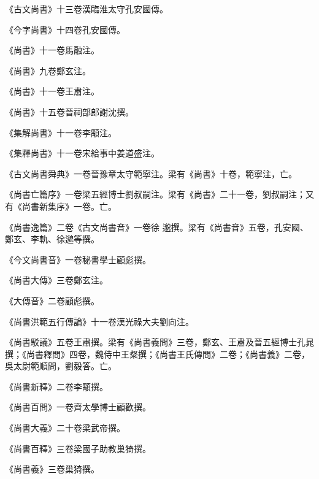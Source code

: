 \begin{pinyinscope}
 《古文尚書》十三卷漢臨淮太守孔安國傳。



 《今字尚書》十四卷孔安國傳。



 《尚書》十一卷馬融注。



 《尚書》九卷鄭玄注。



 《尚書》十一卷王肅注。



 《尚書》十五卷晉祠部郎謝沈撰。



 《集解尚書》十一卷李顒注。



 《集釋尚書》十一卷宋給事中姜道盛注。



 《古文尚書舜典》一卷晉豫章太守範寧注。梁有《尚書》十卷，範寧注，亡。



 《尚書亡篇序》一卷梁五經博士劉叔嗣注。梁有《尚書》二十一卷，劉叔嗣注；又有《尚書新集序》一卷。亡。



 《尚書逸篇》二卷《古文尚書音》一卷徐
 邈撰。梁有《尚書音》五卷，孔安國、鄭玄、李軌、徐邈等撰。



 《今文尚書音》一卷秘書學士顧彪撰。



 《尚書大傳》三卷鄭玄注。



 《大傳音》二卷顧彪撰。



 《尚書洪範五行傳論》十一卷漢光祿大夫劉向注。



 《尚書駁議》五卷王肅撰。梁有《尚書義問》三卷，鄭玄、王肅及晉五經博士孔晁撰；《尚書釋問》四卷，魏侍中王粲撰；《尚書王氏傳問》二卷；《尚書義》二卷，吳太尉範順問，劉毅答。亡。



 《尚書新釋》二卷李顒撰。



 《尚書百問》一卷齊太學博士顧歡撰。



 《尚書大義》二十卷梁武帝撰。



 《尚書百釋》三卷梁國子助教巢猗撰。



 《尚書義》三卷巢猗撰。




\end{pinyinscope}
